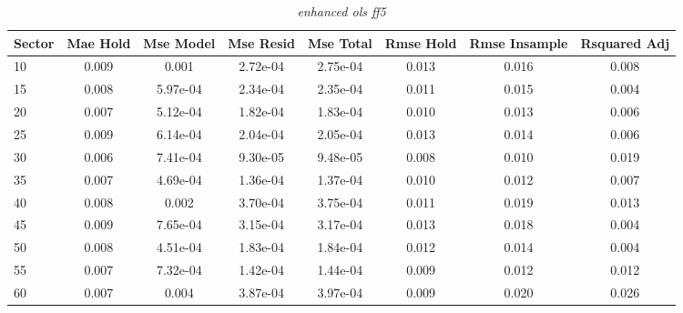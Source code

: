 \begin{table}[H]
\caption{\textit{enhanced ols ff5}}\label{tab:enhanced_ols_ff5}
\centering
\begin{tabular}{lccccccc}
\hline\hline
Sector & Mae Hold & Mse Model & Mse Resid & Mse Total & Rmse Hold & Rmse Insample & Rsquared Adj \\ 
\hline
10 & 0.009 & 0.001 & 2.72e-04 & 2.75e-04 & 0.013 & 0.016 & 0.008 \\ 
15 & 0.008 & 5.97e-04 & 2.34e-04 & 2.35e-04 & 0.011 & 0.015 & 0.004 \\ 
20 & 0.007 & 5.12e-04 & 1.82e-04 & 1.83e-04 & 0.010 & 0.013 & 0.006 \\ 
25 & 0.009 & 6.14e-04 & 2.04e-04 & 2.05e-04 & 0.013 & 0.014 & 0.006 \\ 
30 & 0.006 & 7.41e-04 & 9.30e-05 & 9.48e-05 & 0.008 & 0.010 & 0.019 \\ 
35 & 0.007 & 4.69e-04 & 1.36e-04 & 1.37e-04 & 0.010 & 0.012 & 0.007 \\ 
40 & 0.008 & 0.002 & 3.70e-04 & 3.75e-04 & 0.011 & 0.019 & 0.013 \\ 
45 & 0.009 & 7.65e-04 & 3.15e-04 & 3.17e-04 & 0.013 & 0.018 & 0.004 \\ 
50 & 0.008 & 4.51e-04 & 1.83e-04 & 1.84e-04 & 0.012 & 0.014 & 0.004 \\ 
55 & 0.007 & 7.32e-04 & 1.42e-04 & 1.44e-04 & 0.009 & 0.012 & 0.012 \\ 
60 & 0.007 & 0.004 & 3.87e-04 & 3.97e-04 & 0.009 & 0.020 & 0.026 \\ 
\hline
\end{tabular}
\end{table}


